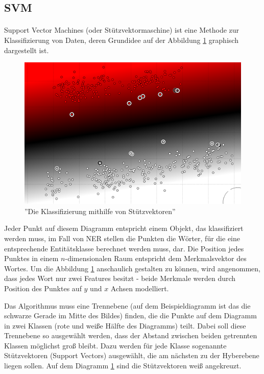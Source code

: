 \subsection{SVM} \label{sec:SVNGRUND}
\paragraph{}
Support Vector Machines (oder Stützvektormaschine) ist eine Methode zur Klassifizierung von Daten, deren Grundidee\cite{meyer2014support} auf der Abbildung \ref{fig:SVM-INTRO} graphisch dargestellt ist. 

\begin{figure}
\centering
\includegraphics[width=\textwidth,angle=90]{Bilder/svm-intro.png}
\caption{''Die Klassifizierung mithilfe von Stützvektoren''}
\label{fig:SVM-INTRO}
\end{figure}

Jeder Punkt auf diesem Diagramm entspricht einem Objekt, das klassifiziert werden muss, im Fall von NER stellen die Punkten die Wörter, für die eine entsprechende Entitätsklasse berechnet werden muss, dar. Die Position jedes Punktes in einem $n$-dimensionalen Raum entspricht dem Merkmalsvektor des Wortes. Um die Abbildung \ref{fig:SVM-INTRO} anschaulich gestalten zu können, wird angenommen, dass jedes Wort nur zwei Features besitzt - beide Merkmale werden durch Position des Punktes auf $y$ und $x$ Achsen modelliert.

Das Algorithmus muss eine Trennebene (auf dem Beispieldiagramm ist das die schwarze Gerade im Mitte des Bildes) finden, die die Punkte auf dem Diagramm in zwei Klassen (rote und weiße Hälfte des Diagramms) teilt. Dabei soll diese Trennebene so ausgewählt werden, dass der Abstand zwischen beiden getrennten Klassen möglichst groß bleibt. Dazu werden für jede Klasse sogenannte Stützvektoren (Support Vectors) ausgewählt, die am nächsten zu der Hyberebene liegen sollen. Auf dem Diagramm \ref{fig:SVM-INTRO} sind die Stützvektoren weiß angekreuzt.

